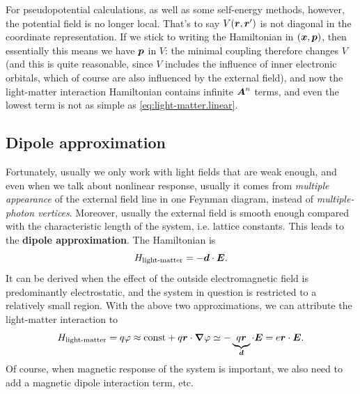 \documentclass[hyperref, a4paper, 12pt]{report}
\newcommand*{\const}{\mathrm{const}}
\newcommand*{\concept}[1]{{\textbf{#1}}}
\begin{document}
For pseudopotential calculations, 
as well as some self-energy methods, 
however, the potential field is no longer local.
That's to say $V(\vb*{r}, \vb*{r}')$ is not diagonal in the coordinate representation.
If we stick to writing the Hamiltonian in $(\vb*{x}, \vb*{p})$,
then essentially this means we have $\vb*{p}$ in $V$:
the minimal coupling therefore changes $V$
(and this is quite reasonable,
since $V$ includes the influence of inner electronic orbitals,
which of course are also influenced by the external field),
and now the light-matter interaction Hamiltonian 
contains infinite $\vb*{A}^n$ terms,
and even the lowest term is not as simple as \eqref{eq:light-matter.linear}.

\subsection{Dipole approximation}

Fortunately, usually we only work with light fields 
that are weak enough,
and even when we talk about nonlinear response,
usually it comes from \emph{multiple appearance} of the external field line in one Feynman diagram,
instead of \emph{multiple-photon vertices}.
Moreover, usually the external field is smooth enough 
compared with the characteristic length of the system, i.e. lattice constants.
This leads to the \concept{dipole approximation}.
The Hamiltonian is 
\begin{equation}
    H_{\text{light-matter}} = - \vb*{d} \cdot \vb*{E}.
\end{equation}
It can be derived when the effect of the outside electromagnetic field is predominantly electrostatic,
and the system in question is restricted to a relatively small region.
With the above two approximations,
we can attribute the light-matter interaction to 
\begin{equation}
    H_{\text{light-matter}} = q \varphi \approx \const + q \vb*{r} \cdot \grad{\varphi}
    \simeq - \underbrace{q \vb*{r}}_{\vb*{d}} \cdot \vb*{E}
    = e \vb*{r} \cdot \vb*{E}.
    \label{eq:light-matter.dipole-1}
\end{equation}
Of course, when magnetic response of the system is important, 
we also need to add a magnetic dipole interaction term, etc. 
\end{document}
